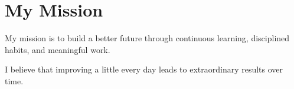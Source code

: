 \section{My Mission}

My mission is to build a better future through continuous learning, disciplined habits, and meaningful work.

I believe that improving a little every day leads to extraordinary results over time.